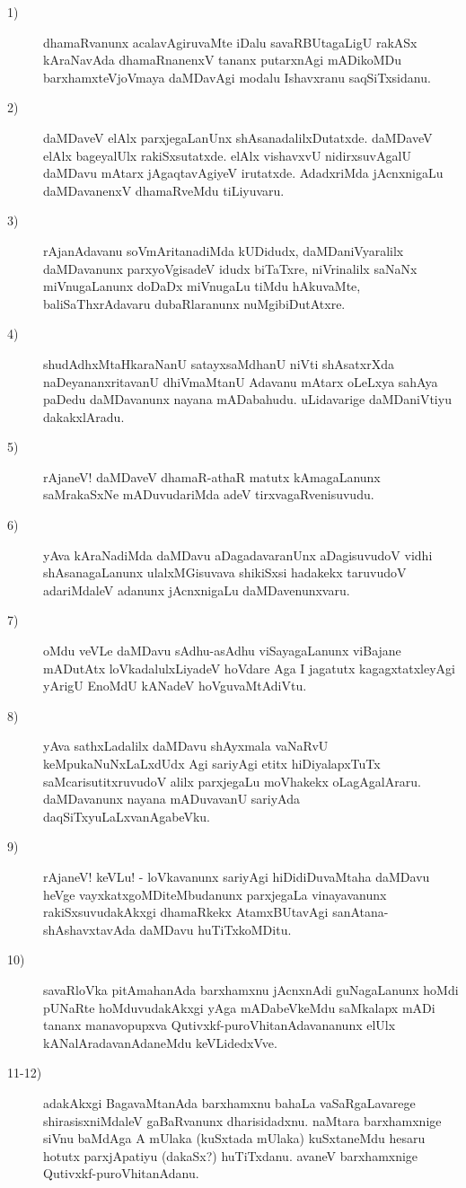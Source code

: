 \begin{description}
\item [1)] dhamaRvanunx acalavAgiruvaMte iDalu savaRBUtagaLigU rakASx kAraNavAda dhamaRnanenxV tananx putarxnAgi mADikoMDu barxhamxteVjoVmaya daMDavAgi modalu Ishavxranu saqSiTxsidanu.
\item [2)] daMDaveV elAlx parxjegaLanUnx shAsanadalilxDutatxde. daMDaveV elAlx bageyalUlx rakiSxsutatxde. elAlx vishavxvU nidirxsuvAgalU daMDavu mAtarx jAgaqtavAgiyeV irutatxde. AdadxriMda jAcnxnigaLu daMDavanenxV dhamaRveMdu tiLiyuvaru.
\item [3)] rAjanAdavanu soVmAritanadiMda kUDidudx, daMDaniVyaralilx daMDavanunx parxyoVgisadeV idudx biTaTxre, niVrinalilx saNaNx miVnugaLanunx doDaDx miVnugaLu tiMdu hAkuvaMte, baliSaThxrAdavaru dubaRlaranunx nuMgibiDutAtxre.
\item [4)] shudAdhxMtaHkaraNanU satayxsaMdhanU niVti shAsatxrXda naDeyananxritavanU dhiVmaMtanU Adavanu mAtarx oLeLxya sahAya paDedu daMDavanunx nayana mADabahudu. uLidavarige daMDaniVtiyu dakakxlAradu. 
\item [5)] rAjaneV! daMDaveV dhamaR-athaR matutx kAmagaLanunx saMrakaSxNe mADuvudariMda adeV tirxvagaRvenisuvudu.
\item [6)] yAva kAraNadiMda daMDavu aDagadavaranUnx aDagisuvudoV vidhi shAsanagaLanunx ulalxMGisuvava shikiSxsi hadakekx taruvudoV adariMdaleV adanunx jAcnxnigaLu daMDavenunxvaru.
\item [7)] oMdu veVLe daMDavu sAdhu-asAdhu viSayagaLanunx viBajane mADutAtx loVkadalulxLiyadeV hoVdare Aga I jagatutx kagagxtatxleyAgi yArigU EnoMdU kANadeV hoVguvaMtAdiVtu.
\item [8)] yAva sathxLadalilx daMDavu shAyxmala vaNaRvU keMpukaNuNxLaLxdUdx Agi sariyAgi etitx hiDiyalapxTuTx saMcarisutitxruvudoV alilx parxjegaLu moVhakekx oLagAgalAraru. daMDavanunx nayana mADuvavanU sariyAda daqSiTxyuLaLxvanAgabeVku.
\item [9)] rAjaneV! keVLu! - loVkavanunx sariyAgi hiDidiDuvaMtaha daMDavu heVge vayxkatxgoMDiteMbudanunx parxjegaLa vinayavanunx rakiSxsuvudakAkxgi dhamaRkekx AtamxBUtavAgi sanAtana-shAshavxtavAda daMDavu huTiTxkoMDitu.
\item [10)] savaRloVka pitAmahanAda barxhamxnu jAcnxnAdi guNagaLanunx hoMdi pUNaRte hoMduvudakAkxgi yAga mADabeVkeMdu saMkalapx mADi tananx manavopupxva Qutivxkf-puroVhitanAdavananunx elUlx kANalAradavanAdaneMdu keVLidedxVve.
\item [11-12)] adakAkxgi BagavaMtanAda barxhamxnu bahaLa vaSaRgaLavarege shirasisxniMdaleV gaBaRvanunx dharisidadxnu. naMtara barxhamxnige siVnu baMdAga A mUlaka (kuSxtada mUlaka) kuSxtaneMdu hesaru hotutx parxjApatiyu (dakaSx?) huTiTxdanu. avaneV barxhamxnige Qutivxkf-puroVhitanAdanu.


\end{description}
